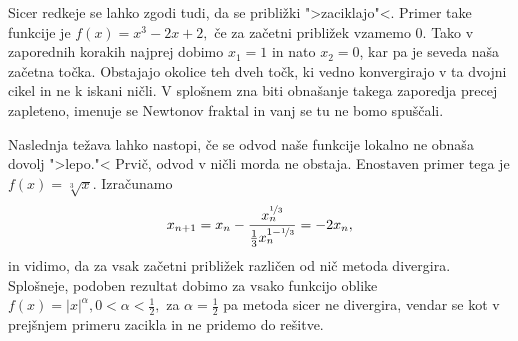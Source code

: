 \documentclass[12pt,a4paper]{amsart}
\theoremstyle{definition} %
\theoremstyle{plain} %
\begin{document}
Sicer redkeje se lahko zgodi tudi, da se približki ">zaciklajo"<. Primer take funkcije je $f(x) = x^3 - 2x + 2,$ če za začetni približek vzamemo 0. Tako v zaporednih korakih najprej dobimo
$x_{1} = 1$ in nato $x_{2} = 0$, kar pa je seveda naša začetna točka. Obstajajo okolice teh dveh točk, ki vedno konvergirajo v ta dvojni cikel in ne k iskani ničli. V splošnem 
zna biti obnašanje takega zaporedja precej zapleteno, imenuje se Newtonov fraktal in vanj se tu ne bomo spuščali.

Naslednja težava lahko nastopi, če se odvod naše funkcije lokalno ne obnaša dovolj ">lepo."< Prvič, odvod v ničli morda ne obstaja. Enostaven primer tega je 
$f(x) = \sqrt[3]{x}.$ Izračunamo
\[
    x_{n+1} = x_{n} - \frac{x_{n} ^ {\nicefrac{1}{3}}}{\frac{1}{3}x_{n}^{1 - \nicefrac{1}{3}}} = -2x_{n},
\]
in vidimo, da za vsak začetni približek različen od nič metoda divergira. Splošneje, podoben rezultat dobimo za vsako funkcijo oblike $f(x) = \lvert x \rvert^{\alpha}, 0 < \alpha < \frac{1}{2},$
za $\alpha = \frac{1}{2}$ pa metoda sicer ne divergira, vendar se kot v prejšnjem primeru zacikla in ne pridemo do rešitve.
\end{document}
